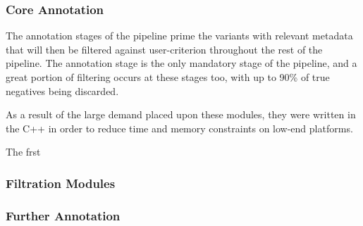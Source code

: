 
\subsubsection{Core Annotation}

The annotation stages of the pipeline prime the variants with relevant metadata that will then be filtered against user-criterion throughout the rest of the pipeline. The annotation stage is the only mandatory stage of the pipeline, and a great portion of filtering occurs at these stages too, with up to 90\% of  true negatives being discarded.

As a result of the large demand placed upon these modules, they were written in the C++ in order to reduce time and memory constraints on low-end platforms.

The frst 

\subsubsection{Filtration Modules}
\subsubsection{Further Annotation}
